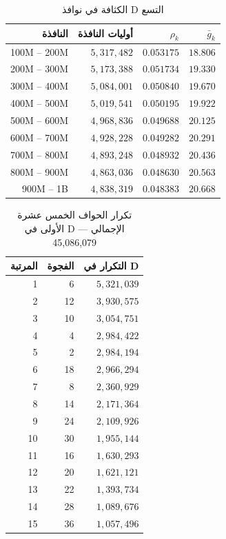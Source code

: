 \documentclass[12pt,a4paper]{article}
\begin{document}
\begin{table}[H]
\centering
\begin{tabular}{rrrr}
\toprule
النافذة & أوليات النافذة & $\rho_k$ & $\bar{g}_k$ \\
\midrule
100M -- 200M & $5{,}317{,}482$ & $0.053175$ & $18.806$ \\
200M -- 300M & $5{,}173{,}388$ & $0.051734$ & $19.330$ \\
300M -- 400M & $5{,}084{,}001$ & $0.050840$ & $19.670$ \\
400M -- 500M & $5{,}019{,}541$ & $0.050195$ & $19.922$ \\
500M -- 600M & $4{,}968{,}836$ & $0.049688$ & $20.125$ \\
600M -- 700M & $4{,}928{,}228$ & $0.049282$ & $20.291$ \\
700M -- 800M & $4{,}893{,}248$ & $0.048932$ & $20.436$ \\
800M -- 900M & $4{,}863{,}036$ & $0.048630$ & $20.563$ \\
900M -- 1B & $4{,}838{,}319$ & $0.048383$ & $20.668$ \\
\bottomrule
\end{tabular}
\caption{الكثافة في نوافذ D التسع}
\end{table}

\begin{table}[H]
\centering
\begin{tabular}{rrr}
\toprule
المرتبة & الفجوة & التكرار في D \\
\midrule
1 & 6 & $5{,}321{,}039$ \\
2 & 12 & $3{,}930{,}575$ \\
3 & 10 & $3{,}054{,}751$ \\
4 & 4 & $2{,}984{,}422$ \\
5 & 2 & $2{,}984{,}194$ \\
6 & 18 & $2{,}966{,}294$ \\
7 & 8 & $2{,}360{,}929$ \\
8 & 14 & $2{,}171{,}364$ \\
9 & 24 & $2{,}109{,}926$ \\
10 & 30 & $1{,}955{,}144$ \\
11 & 16 & $1{,}630{,}293$ \\
12 & 20 & $1{,}621{,}121$ \\
13 & 22 & $1{,}393{,}734$ \\
14 & 28 & $1{,}089{,}676$ \\
15 & 36 & $1{,}057{,}496$ \\
\bottomrule
\end{tabular}
\caption{تكرار الحواف الخمس عشرة الأولى في D — الإجمالي 45,086,079}
\end{table}
\end{document}
